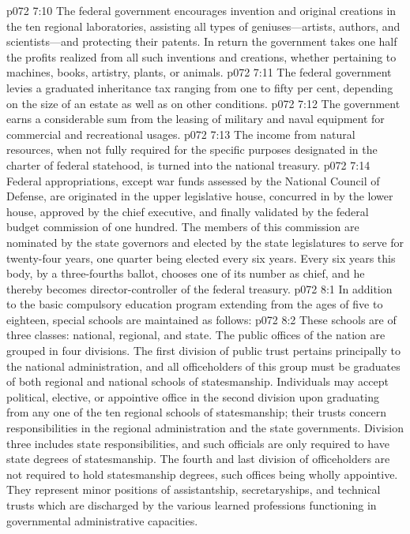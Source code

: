 \pc \vs p072 7:10 \bibnobreakspace {} The federal government encourages invention and original creations in the ten regional laboratories, assisting all types of geniuses---artists, authors, and scientists---and protecting their patents. In return the government takes one half the profits realized from all such inventions and creations, whether pertaining to machines, books, artistry, plants, or animals.\plusone
\pc \vs p072 7:11 \bibnobreakspace {} The federal government levies a graduated inheritance tax ranging from one to fifty per cent, depending on the size of an estate as well as on other conditions.
\pc \vs p072 7:12 \bibnobreakspace {} The government earns a considerable sum from the leasing of military and naval equipment for commercial and recreational usages.
\pc \vs p072 7:13 \bibnobreakspace {} The income from natural resources, when not fully required for the specific purposes designated in the charter of federal statehood, is turned into the national treasury.
\pc \vs p072 7:14 Federal appropriations, except war funds assessed by the National Council of Defense, are originated in the upper legislative house, concurred in by the lower house, approved by the chief executive, and finally validated by the federal budget commission of one hundred. The members of this commission are nominated by the state governors and elected by the state legislatures to serve for twenty\hyp{}four years, one quarter being elected every six years. Every six years this body, by a three\hyp{}fourths ballot, chooses one of its number as chief, and he thereby becomes director\hyp{}controller of the federal treasury.
\vs p072 8:1 In addition to the basic compulsory education program extending from the ages of five to eighteen, special schools are maintained as follows:
\pc \vs p072 8:2 \bibnobreakspace {} These schools are of three classes: national, regional, and state. The public offices of the nation are grouped in four divisions. The first division of public trust pertains principally to the national administration, and all officeholders of this group must be graduates of both regional and national schools of statesmanship. Individuals may accept political, elective, or appointive office in the second division upon graduating from any one of the ten regional schools of statesmanship; their trusts concern responsibilities in the regional administration and the state governments. Division three includes state responsibilities, and such officials are only required to have state degrees of statesmanship. The fourth and last division of officeholders are not required to hold statesmanship degrees, such offices being wholly appointive. They represent minor positions of assistantship, secretaryships, and technical trusts which are discharged by the various learned professions functioning in governmental administrative capacities.
